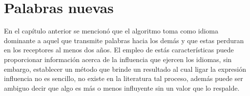 \chapter{Palabras nuevas}



En el capítulo anterior se mencionó que el algoritmo toma como  idioma
dominante a aquel que transmite palabras hacia los demás y que estas perduran en los receptores al menos dos años. El empleo de estás características puede proporcionar información acerca de la influencia que ejercen los idiomas,  sin  embargo, establecer un método que brinde un resultado al cual ligar la expresión influencia  no es sencillo, no existe en la literatura tal proceso, además puede ser ambiguo decir que algo es más o menos influyente sin un valor que lo respalde.




% 
% 



 


 


